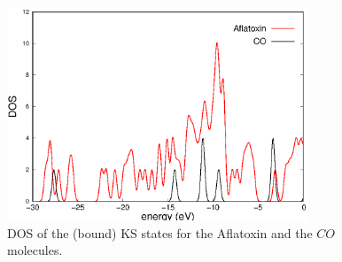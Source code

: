 \documentclass[11pt,a4paper]{article}
\begin{document}
\begin{figure}[h]
    \centering
    \includegraphics[width=9cm]{DOS_Afla&CO.eps}
    \caption{DOS of the (bound) KS states for the Aflatoxin and the $CO$ molecules. }
\label{dos}
\end{figure}



\end{document}
